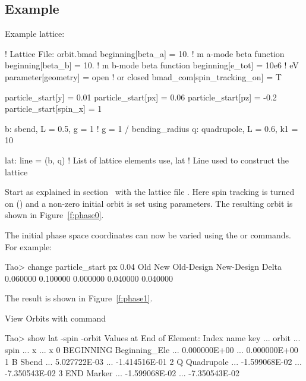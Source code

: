 \documentclass{hitec}     %
\begin{document}
{%
\subsection{Example}

Example lattice:
\begin{code}
! Lattice File: orbit.bmad
beginning[beta_a] = 10.   ! m  a-mode beta function
beginning[beta_b] = 10.   ! m  b-mode beta function
beginning[e_tot] = 10e6   ! eV
parameter[geometry] = open  ! or closed
bmad_com[spin_tracking_on] = T

particle_start[y] = 0.01
particle_start[px] = 0.06
particle_start[pz] = -0.2
particle_start[spin_x] = 1

b: sbend, L = 0.5, g = 1    ! g = 1 / bending_radius
q: quadrupole, L = 0.6, k1 = 10

lat: line = (b, q)   ! List of lattice elements
use, lat                ! Line used to construct the lattice
\end{code}

Start \tao as explained in section~ with the lattice file . Here
spin tracking is turned on () and a non-zero initial orbit is set
using  parameters. The resulting orbit is shown in Figure~\ref{f:phase0}.

The initial phase space coordinates can now be varied using the  or 
commands. For example:
\begin{code}
Tao> change particle_start px 0.04
           Old           New    Old-Design    New-Design         Delta
      0.060000      0.100000      0.000000      0.040000      0.040000  
\end{code}

The result is shown in Figure~\ref{f:phase1}. 

View Orbits with  command

\begin{code}
Tao> show lat -spin -orbit
      Values at End of Element:
 Index  name      key           ...           orbit  ...          spin 
                                ...               x  ...             x 
     0  BEGINNING Beginning_Ele ...    0.000000E+00  ...  0.000000E+00 
     1  B         Sbend         ...    5.027722E-03  ... -1.414516E-01 
     2  Q         Quadrupole    ...   -1.599068E-02  ... -7.350543E-02 
     3  END       Marker        ...   -1.599068E-02  ... -7.350543E-02 
\end{code}

}
\end{document}
